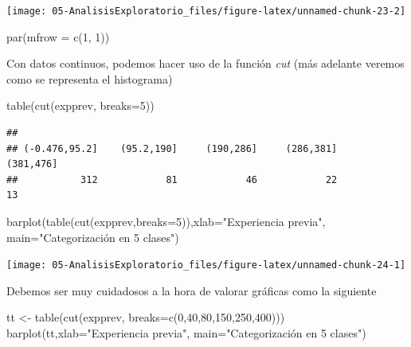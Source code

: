 \documentclass[
]{book}
\newenvironment{Shaded}{\begin{snugshade}}{\end{snugshade}}
\newcommand{\AttributeTok}[1]{\textcolor[rgb]{0.77,0.63,0.00}{#1}}
\newcommand{\DecValTok}[1]{\textcolor[rgb]{0.00,0.00,0.81}{#1}}
\newcommand{\FunctionTok}[1]{\textcolor[rgb]{0.00,0.00,0.00}{#1}}
\newcommand{\NormalTok}[1]{#1}
\newcommand{\OtherTok}[1]{\textcolor[rgb]{0.56,0.35,0.01}{#1}}
\newcommand{\StringTok}[1]{\textcolor[rgb]{0.31,0.60,0.02}{#1}}
\theoremstyle{break}
\begin{document}
\begin{center}\texttt{[image: 05-AnalisisExploratorio\_files/figure-latex/unnamed-chunk-23-2]} \end{center}

\begin{Shaded}
\begin{Highlighting}[]
\FunctionTok{par}\NormalTok{(}\AttributeTok{mfrow =} \FunctionTok{c}\NormalTok{(}\DecValTok{1}\NormalTok{, }\DecValTok{1}\NormalTok{))}
\end{Highlighting}
\end{Shaded}

Con datos continuos, podemos hacer uso de la función \emph{cut}
(más adelante veremos como se representa el histograma)

\begin{Shaded}
\begin{Highlighting}[]
\FunctionTok{table}\NormalTok{(}\FunctionTok{cut}\NormalTok{(expprev, }\AttributeTok{breaks=}\DecValTok{5}\NormalTok{))}
\end{Highlighting}
\end{Shaded}

\begin{verbatim}
## 
## (-0.476,95.2]    (95.2,190]     (190,286]     (286,381]     (381,476] 
##           312            81            46            22            13
\end{verbatim}

\begin{Shaded}
\begin{Highlighting}[]
\FunctionTok{barplot}\NormalTok{(}\FunctionTok{table}\NormalTok{(}\FunctionTok{cut}\NormalTok{(expprev,}\AttributeTok{breaks=}\DecValTok{5}\NormalTok{)),}\AttributeTok{xlab=}\StringTok{"Experiencia previa"}\NormalTok{,}
        \AttributeTok{main=}\StringTok{"Categorización en 5 clases"}\NormalTok{)}
\end{Highlighting}
\end{Shaded}

\begin{center}\texttt{[image: 05-AnalisisExploratorio\_files/figure-latex/unnamed-chunk-24-1]} \end{center}

Debemos ser muy cuidadosos a la hora de valorar gráficas como la siguiente

\begin{Shaded}
\begin{Highlighting}[]
\NormalTok{tt }\OtherTok{\textless{}{-}} \FunctionTok{table}\NormalTok{(}\FunctionTok{cut}\NormalTok{(expprev, }\AttributeTok{breaks=}\FunctionTok{c}\NormalTok{(}\DecValTok{0}\NormalTok{,}\DecValTok{40}\NormalTok{,}\DecValTok{80}\NormalTok{,}\DecValTok{150}\NormalTok{,}\DecValTok{250}\NormalTok{,}\DecValTok{400}\NormalTok{)))}
\FunctionTok{barplot}\NormalTok{(tt,}\AttributeTok{xlab=}\StringTok{"Experiencia previa"}\NormalTok{, }\AttributeTok{main=}\StringTok{"Categorización en 5 clases"}\NormalTok{)}
\end{Highlighting}
\end{Shaded}
\end{document}
